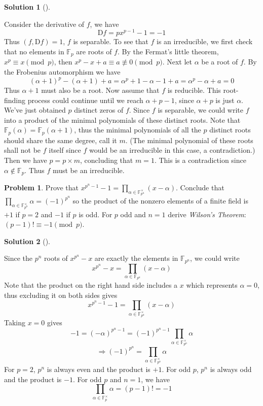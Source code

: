 \documentclass{article}
\theoremstyle{definition}
\newtheorem{prob}{Problem}
\newtheorem*{sol}{Solution}
\newenvironment{sols}[1][]{%
  \begin{sol}[#1]$ $\par\nobreak\ignorespaces
}{%
  \end{sol}
}
\begin{document}
\begin{sols}
	Consider the derivative of $f$, we have
	\[
		\mathrm{D} f = p x^{p - 1} - 1 = -1
	\]
	Thus $(f, \mathrm{D} f) = 1$, $f$ is separable.
	To see that $f$ is an irreducible, we first check that no elements in $\mathbb{F}_p$ are roots of $f$.
	By the Fermat's little theorem, $x^p \equiv x \pmod{p}$, then $x^p - x + a \equiv a \not\equiv 0 \pmod{p}$.
	Next let $\alpha$ be a root of $f$. 
	By the Frobenius automorphism we have
	\[
		(\alpha + 1)^p - (\alpha + 1) + a = \alpha^p + 1 - \alpha - 1 + a = \alpha^p - \alpha + a = 0
	\]
	Thus $\alpha + 1$ must also be a root.
	Now assume that $f$ is reducible.
	This root-finding process could continue until we reach $\alpha + p - 1$, since $\alpha + p$ is just $\alpha$.
	We've just obtained $p$ distinct zeros of $f$.
	Since $f$ is separable, we could write $f$ into a product of the minimal polynomials of these distinct roots.
	Note that $\mathbb{F}_p(\alpha) = \mathbb{F}_p(\alpha + 1)$, thus the minimal polynomials of all the $p$ distinct roots should share the same degree, call it $m$.
	(The minimal polynomial of these roots shall not be $f$ itself since $f$ would be an irreducible in this case, a contradiction.)
	Then we have $p = p \times m$, concluding that $m = 1$.
	This is a contradiction since $\alpha \notin \mathbb{F}_p$.
	Thus $f$ must be an irreducible.
\end{sols}

\begin{prob}
	Prove that $x^{p^n - 1} - 1 = \prod_{\alpha \in \mathbb{F}_{p^n}^\times} (x - \alpha)$.
	Conclude that $\prod_{\alpha \in \mathbb{F}_{p^n}^\times} \alpha = (-1)^{p^n}$ so the product of the nonzero elements of a finite field is $+1$ if $p = 2$ and $-1$ if $p$ is odd.
	For $p$ odd and $n = 1$ derive \textit{Wilson's Theorem}: $(p - 1)! \equiv -1 \pmod{p}$.
\end{prob}

\begin{sols}
	Since the $p^n$ roots of $x^{p^n} - x$ are exactly the elements in $\mathbb{F}_{p^n}$, we could write
	\[
		x^{p^n} - x = \prod_{\alpha \in \mathbb{F}_{p^n}} (x - \alpha)
	\]
	Note that the product on the right hand side includes a $x$ which represents $\alpha = 0$, thus excluding it on both sides gives
	\[
		x^{p^n - 1} - 1 = \prod_{\alpha \in \mathbb{F}_{p^n}^\times} (x - \alpha)
	\]
	Taking $x = 0$ gives
	\[
		-1 = (-\alpha)^{p^n - 1} = (-1)^{p^n - 1} \prod_{\alpha \in \mathbb{F}_{p^n}^\times} \alpha
	\]
	\[
		\Rightarrow (-1)^{p^n} = \prod_{\alpha \in \mathbb{F}_{p^n}^\times} \alpha
	\]
	For $p = 2$, $p^n$ is always even and the product is $+1$.
	For odd $p$, $p^n$ is always odd and the product is $-1$.
	For odd $p$ and $n = 1$, we have
	\[
		\prod_{\alpha \in \mathbb{F}_{p}^\times} \alpha = (p - 1)! = -1
	\]
\end{sols}
\end{document}
